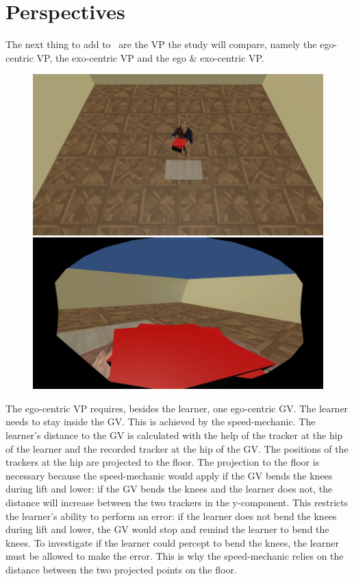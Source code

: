 \section{Perspectives}
\label{sec:perspectives}
The next thing to add to \exgo\ are the VP the study will compare, namely the ego-centric VP, the exo-centric VP and the ego \& exo-centric VP.\\
\begin{figure}[htb]
	\centering
	\includegraphics[width=\textwidth]{figures/perspectiveEGO.png}
	\caption[]{}
	\label{fig:ego}
\end{figure}
The ego-centric VP requires, besides the learner, one ego-centric GV. The learner needs to stay inside the GV. This is achieved by the speed-mechanic. The learner's distance to the GV is calculated with the help of the tracker at the hip of the learner and the recorded tracker at the hip of the GV. The positions of the trackers at the hip are projected to the floor. The projection to the floor is necessary because the speed-mechanic would apply if the GV bends the knees during lift and lower: if the GV bends the knees and the learner does not, the distance will increase between the two trackers in the y-component. This restricts the learner's ability to perform an error: if the learner does not bend the knees during lift and lower, the GV would stop and remind the learner to bend the knees. To investigate if the learner could percept to bend the knees, the learner must be allowed to make the error. This is why the speed-mechanic relies on the distance between the two projected points on the floor.\\
